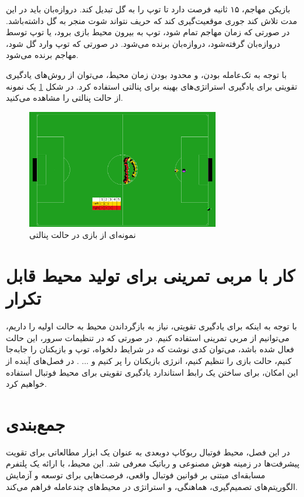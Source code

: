 بازیکن مهاجم، ۱۵ ثانیه فرصت دارد تا توپ را به گل تبدیل کند. دروازه‌بان باید در این مدت تلاش کند جوری موقعیت‌گیری کند که حریف نتواند شوت منجر به گل داشته‌باشد.
در صورتی که زمان مهاجم تمام شود، توپ به بیرون محیط بازی برود، یا توپ توسط دروازه‌بان گرفته‌شود، دروازه‌بان برنده می‌شود. در صورتی که توپ وارد گل شود، مهاجم برنده می‌شود.

با توجه به تک‌عامله بودن، و محدود بودن زمان محیط، می‌توان از روش‌های یادگیری تقویتی برای یادگیری استراتژی‌های بهینه برای پنالتی استفاده کرد.
در شکل
\ref{fig:penalty_demo}
 یک نمونه از حالت پنالتی را مشاهده می‌کنید.
\begin{figure}[H]
\centering
\includegraphics[width=0.75\textwidth]{images/penalty.png}
\caption{نمونه‌ای از بازی در حالت پنالتی}\label{fig:penalty_demo}
\end{figure}
\section{کار با مربی تمرینی برای تولید محیط‌ قابل تکرار}
با توجه به اینکه برای یادگیری تقویتی، نیاز به بازگرداندن محیط به حالت اولیه را داریم، می‌توانیم از 
مربی تمرینی 
استفاده کنیم.
در صورتی که در تنظیمات سرور، این حالت فعال شده باشد، می‌توان کدی نوشت که در شرایط دلخواه، توپ و بازیکنان را جا‌به‌جا کنیم،
حالت بازی را تنظیم کنیم، انرژی بازیکنان را پر کنیم‌ و ... .
در فصل‌های آینده از این امکان، برای ساختن یک رابط استاندارد یادگیری تقویتی برای محیط فوتبال استفاده خواهیم کرد.
\section{جمع‌بندی}
در این فصل، محیط فوتبال ربوکاپ دوبعدی به عنوان یک ابزار مطالعاتی برای تقویت پیشرفت‌ها در زمینه هوش مصنوعی و رباتیک معرفی شد.
این محیط، با ارائه یک پلتفرم مسابقه‌ای مبتنی بر قوانین فوتبال واقعی، فرصت‌هایی برای توسعه و آزمایش الگوریتم‌های تصمیم‌گیری، هماهنگی، و استراتژی در محیط‌های چندعامله فراهم می‌کند.

